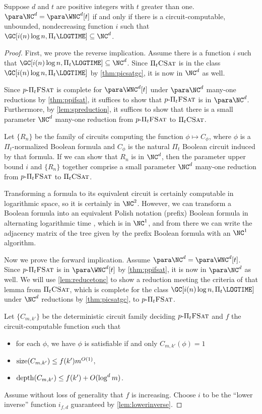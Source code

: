 \begin{theorem}\label{thm:ncwnct}
  Suppose $d$ and $t$ are positive integers with $t$ greater than one.
  $\para \NC^d = \para \WNC^d[t]$ if and only if there is a circuit-computable, unbounded, nondecreasing function $i$ such that %
  $\GC[i(n) \log n, \Pi_t \LOGTIME] \subseteq \NC^d$.
\end{theorem}
\begin{proof}
  First, we prove the reverse implication.
  Assume there is a function $i$ such that $\GC[i(n) \log n, \Pi_t \LOGTIME] \subseteq \NC^d$.
  Since $\Pi_t \textsc{CSat}$ is in the class $\GC[i(n) \log n, \Pi_t \LOGTIME]$ by \autoref{thm:picsatgc}, it is now in $\NC^d$ as well.

  Since $p \textnormal{-} \Pi_t \textsc{FSat}$ is complete for $\para \WNC^d[t]$ under $\para \NC^d$ many-one reductions by \autoref{thm:ppifsat}, it suffices to show that $p \textnormal{-} \Pi_t \textsc{FSat}$ is in $\para \NC^d$.
  Furthermore, by \autoref{lem:spreduction}, it suffices to show that there is a small parameter $\NC^d$ many-one reduction from $p \textnormal{-} \Pi_t \textsc{FSat}$ to $\Pi_t \textsc{CSat}$.

  Let $\{R_n\}$ be the family of circuits computing the function $\phi \mapsto C_\phi$, where $\phi$ is a $\Pi_t$-normalized Boolean formula and $C_\phi$ is the natural $\Pi_t$ Boolean circuit induced by that formula.
  If we can show that $R_n$ is in $\NC^d$, then the parameter upper bound $i$ and $\{R_n\}$ together comprise a small parameter $\NC^d$ many-one reduction from $p \textnormal{-} \Pi_t \textsc{FSat}$ to $\Pi_t \textsc{CSat}$.

  Transforming a formula to its equivalent circuit is certainly computable in logarithmic space, so it is certainly in $\NC^2$.
  However, we can transform a Boolean formula into an equivalent Polish notation (prefix) Boolean formula in alternating logarithmic time \autocite{buss87}, which is in $\NC^1$, and from there we can write the adjacency matrix of the tree given by the prefix Boolean formula with an $\NC^1$ algorithm.

  Now we prove the forward implication.
  Assume $\para \NC^d = \para \WNC^d[t]$.
  Since $p \textnormal{-} \Pi_t \textsc{FSat}$ is in $\para \WNC^d[t]$ by \autoref{thm:ppifsat}, it is now in $\para \NC^d$ as well.
  We will use \autoref{lem:reducetonc} to show a reduction meeting the criteria of that lemma from $\Pi_t \textsc{CSat}$, which is complete for the class $\GC[i(n) \log n, \Pi_t \LOGTIME]$ under $\NC^d$ reductions by \autoref{thm:picsatgc}, to $p \textnormal{-} \Pi_t \textsc{FSat}$.

  Let $\{C_{m, k'}\}$ be the deterministic circuit family deciding $p \textnormal{-} \Pi_t \textsc{FSat}$ and $f$ the circuit-computable function such that
  \begin{itemize}
  \item for each $\phi$, we have $\phi$ is satisfiable if and only $C_{m, k'}(\phi) = 1$
  \item $\operatorname{size}(C_{m, k'}) \leq f(k') m^{O(1)}$,
  \item $\operatorname{depth}(C_{m, k'}) \leq f(k') + O(\log^d m)$.
  \end{itemize}
  Assume without loss of generality that $f$ is increasing.
  Choose $i$ to be the ``lower inverse'' function $i_{f, d}$ guaranteed by \autoref{lem:lowerinverse}.


\end{proof}
